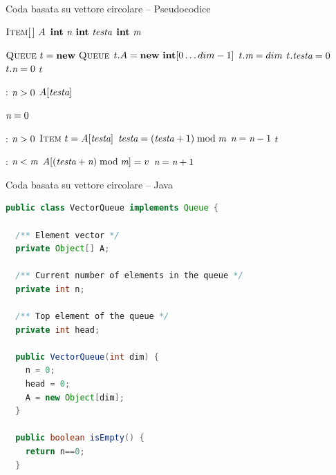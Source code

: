\begin{frame}[shrink=14]{Coda basata su vettore circolare -- Pseudocodice}

\vspace{-12pt}
\begin{Procedure}
\caption{\Queue}
\begin{multicols}{2}
$\textsc{Item}[\,]\ A$
$\INTEGER\ \Size$
$\INTEGER\ \Head$
$\INTEGER\ \Capacity$
\BlankLine

{
  $\Queue\ t = \NEW\ \Queue$\;
  $t.A = \NEW\ \INTEGER[0 \mldots dim-1]$\;
  $t.\textit{m} = dim$\;
  $t.\textit{testa} = 0$\;
  $t.\textit{n} = 0$\;
  \Return $t$\;
}
\BlankLine

\PROCEDURE{\Item\ \queuetop()}
{
  \PRECONDITION: $\textit{n} > 0$\;
  \BlankLine
  \Return $A[\textit{testa}]$
}

\PROCEDURE{\BOOLEAN\ \queueempty()}
{
  \Return $\textit{n} = 0$\;
}
\BlankLine

\PROCEDURE{\Item\ \queueremove()}
{
  \PRECONDITION: $\textit{n} > 0$\;
  \BlankLine
  $\textsc{Item}\ t = A[\textit{testa}]$\;
  $\textit{testa} = (\textit{testa}+1) \bmod \textit{m}$\;
  $\textit{n} = \textit{n}-1$\;
  \Return $t$\;
}
\BlankLine

{
  \PRECONDITION: $\textit{n} < \textit{m}$\;
  \BlankLine
  $A[(\textit{testa}+\textit{n}) \bmod \textit{m}] = v$\; 
  $\textit{n} = \textit{n}+1$\;
}
\end{multicols}
\BlankLine
\BlankLine
\end{Procedure}

\end{frame}



\begin{frame}[fragile,shrink=5]{Coda basata su vettore circolare -- Java}

\begin{lstlisting}[language=Java]
public class VectorQueue implements Queue {

  /** Element vector */
  private Object[] A;

  /** Current number of elements in the queue */
  private int n;    

  /** Top element of the queue */
  private int head;

  public VectorQueue(int dim) {
    n = 0; 
    head = 0;
    A = new Object[dim];
  }

  public boolean isEmpty() {
    return n==0;
  }
\end{lstlisting}

\end{frame}




